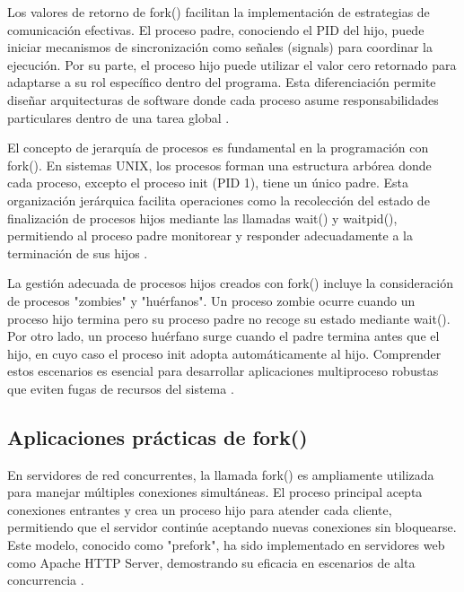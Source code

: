 {Los valores de retorno de fork() facilitan la implementación de estrategias de comunicación efectivas. El proceso padre, conociendo el PID del hijo, puede iniciar mecanismos de sincronización como señales (signals) para coordinar la ejecución. Por su parte, el proceso hijo puede utilizar el valor cero retornado para adaptarse a su rol específico dentro del programa. Esta diferenciación permite diseñar arquitecturas de software donde cada proceso asume responsabilidades particulares dentro de una tarea global \cite{tanenbaum2015modern}.
\vspace{10pt}

El concepto de jerarquía de procesos es fundamental en la programación con fork(). En sistemas UNIX, los procesos forman una estructura arbórea donde cada proceso, excepto el proceso init (PID 1), tiene un único padre. Esta organización jerárquica facilita operaciones como la recolección del estado de finalización de procesos hijos mediante las llamadas wait() y waitpid(), permitiendo al proceso padre monitorear y responder adecuadamente a la terminación de sus hijos \cite{kerrisk2010linux}.
\vspace{10pt}

La gestión adecuada de procesos hijos creados con fork() incluye la consideración de procesos "zombies" y "huérfanos". Un proceso zombie ocurre cuando un proceso hijo termina pero su proceso padre no recoge su estado mediante wait(). Por otro lado, un proceso huérfano surge cuando el padre termina antes que el hijo, en cuyo caso el proceso init adopta automáticamente al hijo. Comprender estos escenarios es esencial para desarrollar aplicaciones multiproceso robustas que eviten fugas de recursos del sistema \cite{love2013linux}.

\subsection{Aplicaciones prácticas de fork()}

En servidores de red concurrentes, la llamada fork() es ampliamente utilizada para manejar múltiples conexiones simultáneas. El proceso principal acepta conexiones entrantes y crea un proceso hijo para atender cada cliente, permitiendo que el servidor continúe aceptando nuevas conexiones sin bloquearse. Este modelo, conocido como "prefork", ha sido implementado en servidores web como Apache HTTP Server, demostrando su eficacia en escenarios de alta concurrencia \cite{beej2016guide}.
\vspace{10pt}

}
